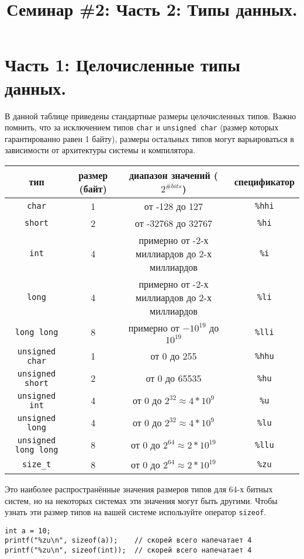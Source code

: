 \documentclass[10pt]{article}
\begin{document}
\title{Семинар \#2: Часть 2: Типы данных. \vspace{-5ex}}\date{}\maketitle
\section*{Часть 1: Целочисленные типы данных.}
В данной таблице приведены стандартные размеры целочисленных типов. Важно помнить, что за исключением типов \texttt{char} и \texttt{unsigned char} (размер которых гарантированно равен 1 байту), размеры остальных типов могут варьироваться в зависимости от архитектуры системы и компилятора.
\begin{center}
\begin{tabular}{ c c c c }
 тип & размер (байт) & диапазон значений ($2^{\# bits}$) & спецификатор \\ \hline
 \texttt{char} & 1 & от -128 до 127 & \texttt{\%hhi} \\ 
 \texttt{short} & 2 & от -32768 до 32767 & \texttt{\%hi}  \\  
 \texttt{int} & 4 & примерно от -2-х миллиардов до 2-х миллиардов & \texttt{\%i}  \\  
 \texttt{long} & 4 & примерно от -2-х миллиардов до 2-х миллиардов & \texttt{\%li}  \\  
 \texttt{long long} & 8 & примерно от $-10^{19}$ до $10^{19}$ & \texttt{\%lli}  \\  
 \texttt{unsigned char} & 1 & от 0 до 255 & \texttt{\%hhu} \\ 
 \texttt{unsigned short} & 2 & от 0 до 65535 & \texttt{\%hu}  \\  
 \texttt{unsigned int} & 4 & от 0 до $2^{32} \approx 4*10^{9}$ & \texttt{\%u}  \\  
 \texttt{unsigned long} & 4 & от 0 до $2^{32} \approx 4*10^{9}$ & \texttt{\%lu}  \\  
 \texttt{unsigned long long} & 8 & от 0 до $2^{64} \approx 2*10^{19}$  & \texttt{\%llu}  \\  
 \texttt{size\_t} & 8 & от 0 до $2^{64} \approx 2*10^{19}$ & \texttt{\%zu} \\ \hline
\end{tabular}
\end{center}
Это наиболее распространённые значения размеров типов для 64-х битных систем, но на некоторых системах эти значения могут быть другими.
Чтобы узнать эти размер типов на вашей системе используйте оператор \texttt{sizeof}. 
\begin{lstlisting}
int a = 10;
printf("%zu\n", sizeof(a));    // скорей всего напечатает 4
printf("%zu\n", sizeof(int));  // скорей всего напечатает 4
\end{lstlisting}
\end{document}
